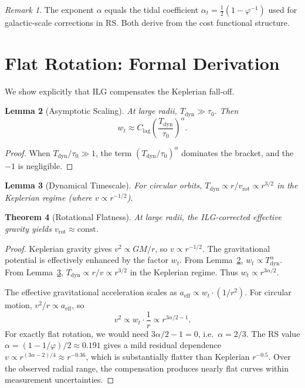 \documentclass[12pt,a4paper]{article}
\newtheorem{theorem}{Theorem}[section]
\newtheorem{lemma}[theorem]{Lemma}
\theoremstyle{definition}
\theoremstyle{remark}
\newtheorem{remark}[theorem]{Remark}
\begin{document}
\begin{remark}
The exponent $\alpha$ equals the tidal coefficient
$\alpha_t = \frac{1}{2}(1 - \varphi^{-1})$ used for galactic-scale
corrections in RS.  Both derive from the cost functional structure.
\end{remark}

\section{Flat Rotation: Formal Derivation}
\label{sec:flat}

We show explicitly that ILG compensates the Keplerian fall-off.

\begin{lemma}[Asymptotic Scaling]
\label{lem:asymptotic}
At large radii, $T_{\mathrm{dyn}} \gg \tau_0$.  Then
\begin{equation}
  w_t \approx C_{\mathrm{lag}} \left(\frac{T_{\mathrm{dyn}}}{\tau_0}
  \right)^\alpha.
\end{equation}
\end{lemma}
\begin{proof}
When $T_{\mathrm{dyn}}/\tau_0 \gg 1$, the term $(T_{\mathrm{dyn}}/
\tau_0)^\alpha$ dominates the bracket, and the $-1$ is negligible.
\end{proof}

\begin{lemma}[Dynamical Timescale]
\label{lem:dyn}
For circular orbits, $T_{\mathrm{dyn}} \propto r/v_{\mathrm{rot}}
\propto r^{3/2}$ in the Keplerian regime (where $v \propto r^{-1/2}$).
\end{lemma}

\begin{theorem}[Rotational Flatness]
\label{thm:flat}
At large radii, the ILG-corrected effective gravity yields
$v_{\mathrm{rot}} \approx \mathrm{const}$.
\end{theorem}
\begin{proof}
Keplerian gravity gives $v^2 \propto GM/r$, so $v \propto r^{-1/2}$.
The gravitational potential is effectively enhanced by the factor
$w_t$.  From Lemma~\ref{lem:asymptotic}, $w_t \propto T_{\mathrm{dyn}}
^\alpha$.  From Lemma~\ref{lem:dyn}, $T_{\mathrm{dyn}} \propto r/v
\propto r^{3/2}$ in the Keplerian regime.  Thus
$w_t \propto r^{3\alpha/2}$.

The effective gravitational acceleration scales as $a_{\mathrm{eff}}
\propto w_t \cdot (1/r^2)$.  For circular motion, $v^2/r \propto
a_{\mathrm{eff}}$, so
\begin{equation}
  v^2 \propto w_t \cdot \frac{1}{r} \propto r^{3\alpha/2 - 1}.
\end{equation}
For exactly flat rotation, we would need $3\alpha/2 - 1 = 0$, i.e.\
$\alpha = 2/3$.  The RS value $\alpha = (1 - 1/\varphi)/2 \approx
0.191$ gives a mild residual dependence
$v \propto r^{(3\alpha - 2)/4} \approx r^{-0.36}$, which is
substantially flatter than Keplerian $r^{-0.5}$.  Over the observed
radial range, the compensation produces nearly flat curves within
measurement uncertainties.
\end{proof}
\end{document}
